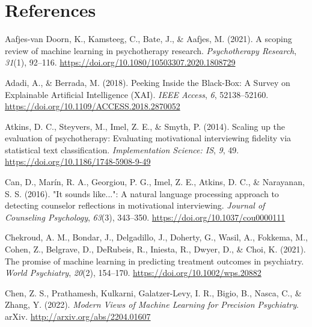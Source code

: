 \documentclass[
  man]{apa7}
\newlength{\cslhangindent}
\newlength{\cslentryspacingunit} %
\newenvironment{CSLReferences}[2] %
 {%
  \setlength{\parindent}{0pt}
  \ifodd #1
  \let\oldpar\par
  \def\par{\hangindent=\cslhangindent\oldpar}
  \fi
  \setlength{\parskip}{#2\cslentryspacingunit}
 }%
 {}
\begin{document}
\newpage

\hypertarget{references}{%
\section{References}\label{references}}

\hypertarget{refs}{}
\begin{CSLReferences}{1}{0}
\leavevmode{}%
Aafjes-van Doorn, K., Kamsteeg, C., Bate, J., \& Aafjes, M. (2021). A scoping review of machine learning in psychotherapy research. \emph{Psychotherapy Research}, \emph{31}(1), 92--116. \url{https://doi.org/10.1080/10503307.2020.1808729}

\leavevmode{}%
Adadi, A., \& Berrada, M. (2018). Peeking {Inside} the {Black}-{Box}: {A} {Survey} on {Explainable} {Artificial} {Intelligence} ({XAI}). \emph{IEEE Access}, \emph{6}, 52138--52160. \url{https://doi.org/10.1109/ACCESS.2018.2870052}

\leavevmode{}%
Atkins, D. C., Steyvers, M., Imel, Z. E., \& Smyth, P. (2014). Scaling up the evaluation of psychotherapy: Evaluating motivational interviewing fidelity via statistical text classification. \emph{Implementation Science: IS}, \emph{9}, 49. \url{https://doi.org/10.1186/1748-5908-9-49}

\leavevmode{}%
Can, D., Marín, R. A., Georgiou, P. G., Imel, Z. E., Atkins, D. C., \& Narayanan, S. S. (2016). "{It} sounds like...": {A} natural language processing approach to detecting counselor reflections in motivational interviewing. \emph{Journal of Counseling Psychology}, \emph{63}(3), 343--350. \url{https://doi.org/10.1037/cou0000111}

\leavevmode{}%
Chekroud, A. M., Bondar, J., Delgadillo, J., Doherty, G., Wasil, A., Fokkema, M., Cohen, Z., Belgrave, D., DeRubeis, R., Iniesta, R., Dwyer, D., \& Choi, K. (2021). The promise of machine learning in predicting treatment outcomes in psychiatry. \emph{World Psychiatry}, \emph{20}(2), 154--170. \url{https://doi.org/10.1002/wps.20882}

\leavevmode{}%
Chen, Z. S., Prathamesh, Kulkarni, Galatzer-Levy, I. R., Bigio, B., Nasca, C., \& Zhang, Y. (2022). \emph{Modern {Views} of {Machine} {Learning} for {Precision} {Psychiatry}}. arXiv. \url{http://arxiv.org/abs/2204.01607}


\end{CSLReferences}
\end{document}
